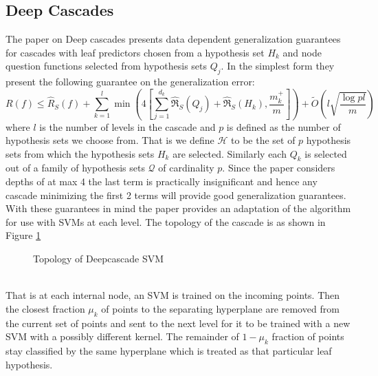 \documentclass[paper=letter, fontsize=11pt]{scrartcl}
\numberwithin{equation}{section}		%
\numberwithin{figure}{section}			%
\numberwithin{table}{section}				%
\begin{document}
\subsection{Deep Cascades}
The paper on Deep cascades presents data dependent generalization guarantees for cascades with leaf predictors chosen from a hypothesis set $H_k$ and node question functions selected from hypothesis sets $Q_j$. In the simplest form they present the following guarantee on the generalization error:
\begin{equation}
R(f) \leq \widehat{R}_S(f) + \sum_{k=1}^{l} \min \left( 4\left[ \sum_{j=1}^{d_k} \widehat{\mathfrak{R}}_S(Q_j) + \widehat{\mathfrak{R}}_S(H_k), \frac{m_k^+}{m} \right] \right)	 + \widetilde{O} \left( l \sqrt{\frac{\log pl}{m}} \right)
\label{dcbound}
\end{equation}
where $l$ is the number of levels in the cascade and $p$ is defined as the number of hypothesis sets we choose from. That is we define $\mathcal{H}$ to be the set of $p$ hypothesis sets from which the hypothesis sets $H_k$ are selected. Similarly each $Q_k$ is selected out of a family of hypothesis sets $\mathcal{Q}$ of cardinality $p$. Since the paper considers depths of at max 4 the last term is practically insignificant and hence any cascade minimizing the first 2 terms will provide good generalization guarantees.
\\With these guarantees in mind the paper provides an adaptation of the algorithm for use with SVMs at each level. The topology of the cascade is as shown in Figure \ref{topology}
\begin{figure}[h]
\centering
{\footnotesize
{}
}
\caption{Topology of Deepcascade SVM}
\label{topology}
\end{figure}
\\That is at each internal node, an SVM is trained on the incoming points. Then the closest fraction $\mu_k$ of points to the separating hyperplane are removed from the current set of points and sent to the next level for it to be trained with a new SVM with a possibly different kernel. The remainder of $1-\mu_k$ fraction of points stay classified by the same hyperplane which is treated as that particular leaf hypothesis.
\end{document}
